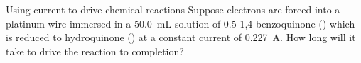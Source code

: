 \documentclass[notes=only]{beamer}
\begin{document}

\begin{frame}[t]{Using current to drive chemical reactions}
	Suppose electrons are forced into a platinum wire immersed in a
	\SI{50.0}{\milli\liter} solution of \SI{0.5}{\Molar} 1,4-benzoquinone
	() which is reduced to hydroquinone () at a
	constant current of \SI{0.227}{\ampere}.  How long will it take
	to drive the reaction to completion?

\end{frame}

\clearpage
\end{document}
